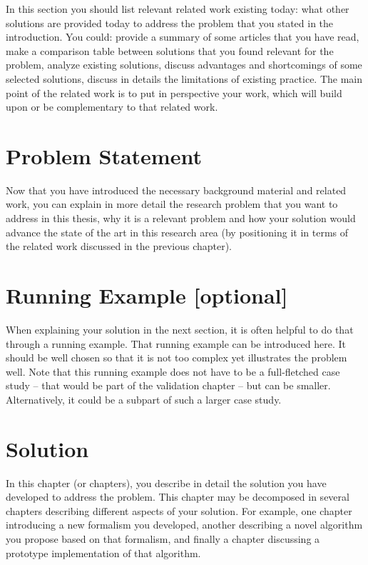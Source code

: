 \documentclass[twocolumn,british]{article}
\begin{document}
In this section you should list relevant related work existing today:
what other solutions are provided today to address the problem that
you stated in the introduction. You could: provide a summary of some
articles that you have read, make a comparison table between solutions
that you found relevant for the problem, analyze existing solutions,
discuss advantages and shortcomings of some selected solutions,
discuss in details the limitations of existing practice. The main
point of the related work is to put in perspective your work, which
will build upon or be complementary to that related work.

\section*{Problem Statement}

Now that you have introduced the necessary background material and
related work, you can explain in more detail the research problem that
you want to address in this thesis, why it is a relevant problem and
how your solution would advance the state of the art in this research
area (by positioning it in terms of the related work discussed in the
previous chapter).

\section*{Running Example [optional]}

When explaining your solution in the next section, it is often helpful
to do that through a running example. That running example can be
introduced here. It should be well chosen so that it is not too
complex yet illustrates the problem well. Note that this running
example does not have to be a full-fletched case study – that would be
part of the validation chapter – but can be smaller. Alternatively, it
could be a subpart of such a larger case study.

\section*{Solution}

In this chapter (or chapters), you describe in detail the solution you
have developed to address the problem. This chapter may be decomposed
in several chapters describing different aspects of your solution. For
example, one chapter introducing a new formalism you developed,
another describing a novel algorithm you propose based on that
formalism, and finally a chapter discussing a prototype implementation
of that algorithm.
\end{document}
